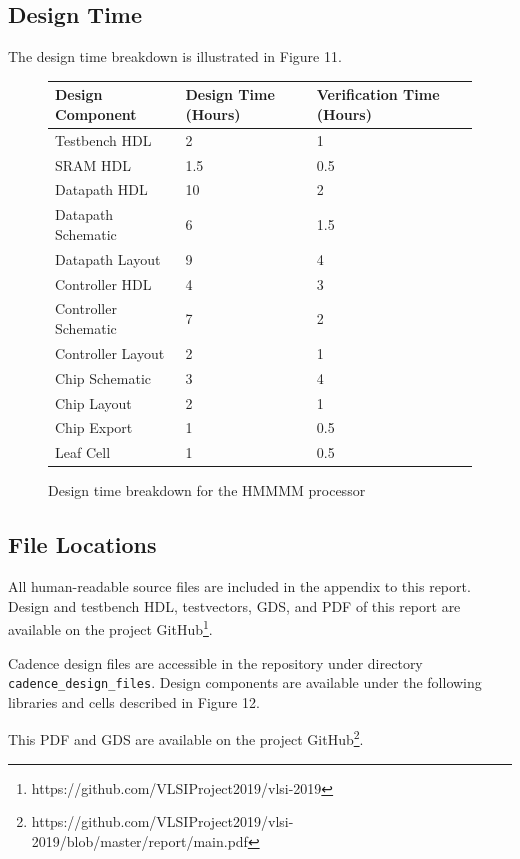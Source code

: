 \documentclass[12pt]{article}
\begin{document}
\subsection{Design Time}

The design time breakdown is illustrated in Figure 11.

\begin{figure}[H]
    \begin{center}
    \begin{tabular}{lll}
        Design Component & Design Time (Hours) & Verification Time (Hours) \\
        \hline
        Testbench HDL & 2 & 1 \\
        SRAM HDL & 1.5 & 0.5 \\
        Datapath HDL & 10 & 2 \\
        Datapath Schematic & 6 & 1.5\\
        Datapath Layout & 9 & 4 \\
        Controller HDL & 4 & 3 \\
        Controller Schematic & 7 & 2 \\
        Controller Layout & 2 & 1 \\
        Chip Schematic & 3 & 4 \\
        Chip Layout & 2 & 1\\
        Chip Export & 1 & 0.5 \\
        Leaf Cell & 1 & 0.5 \\
    \end{tabular}
    \caption{Design time breakdown for the HMMMM processor}
    \end{center}
    \label{fig:designtime}
\end{figure}

\subsection{File Locations}

All human-readable source files are included in the appendix to this report. Design and testbench HDL, testvectors, GDS, and PDF of this report are available on the project GitHub\footnote{https://github.com/VLSIProject2019/vlsi-2019}. 

Cadence design files are accessible in the repository under directory \texttt{cadence\_design\_files}. Design components are available under the following libraries and cells described in Figure 12.

This PDF and GDS are available on the project GitHub\footnote{https://github.com/VLSIProject2019/vlsi-2019/blob/master/report/main.pdf}.
\end{document}
